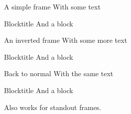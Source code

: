 





\START
\showoutput

\begin{frame}{A simple frame}
  With some text
  \begin{block}{Blocktitle}
    And a block
  \end{block}
\end{frame}

\begin{frame}{An inverted frame}
  With some more text
  \begin{block}{Blocktitle}
    And a block
  \end{block}
\end{frame}

\begin{frame}{Back to normal}
  With the same text
  \begin{block}{Blocktitle}
    And a block
  \end{block}
\end{frame}

\begin{frame}[standout]
  Also works for standout frames.
\end{frame}


